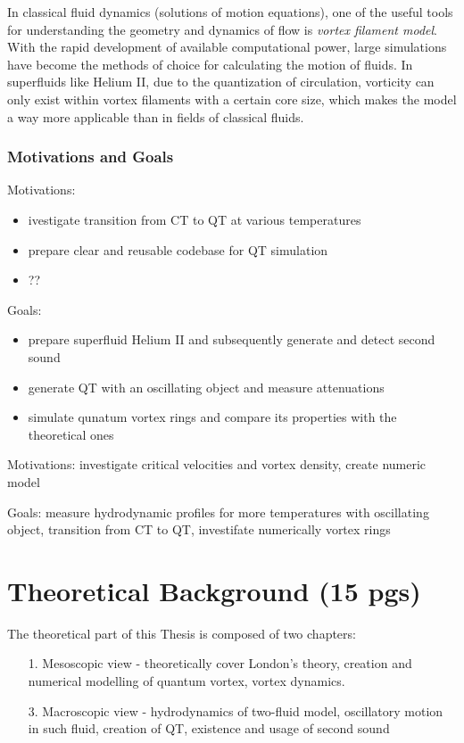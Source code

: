 	In classical fluid dynamics (solutions of motion equations), one of the useful tools for understanding the geometry and dynamics of flow is \textit{vortex filament model}. With the rapid development of available computational power, large simulations have become the methods of choice for calculating the motion of fluids. In superfluids like Helium II, due to the quantization of circulation, vorticity can only exist within vortex filaments with a certain core size, which makes the model a way more applicable than in fields of classical fluids.


	\subsection*{Motivations and Goals}

	Motivations:
	\begin{itemize}
		\item ivestigate transition from CT to QT at various temperatures
		\item prepare clear and reusable codebase for QT simulation
		\item ??
	\end{itemize}

	Goals:
	\begin{itemize}
		\item prepare superfluid Helium II and subsequently generate and detect second sound
		\item generate QT with an oscillating object and measure attenuations
		\item simulate qunatum vortex rings and compare its properties with the theoretical ones
	\end{itemize}

	Motivations: investigate critical velocities and vortex density, create numeric model

	Goals: measure hydrodynamic profiles for more temperatures with oscillating object, transition from CT to QT, investifate numerically vortex rings

\newpage
\chapter{Theoretical Background (15 pgs)}

The theoretical part of this Thesis is composed of two chapters:

\begin{itemize}
	\item[1.] Mesoscopic view - theoretically cover London's theory, creation and numerical modelling of quantum vortex, vortex dynamics.

	\item[3.] Macroscopic view - hydrodynamics of two-fluid model, oscillatory motion in such fluid, creation of QT, existence and usage of second sound

\end{itemize}

